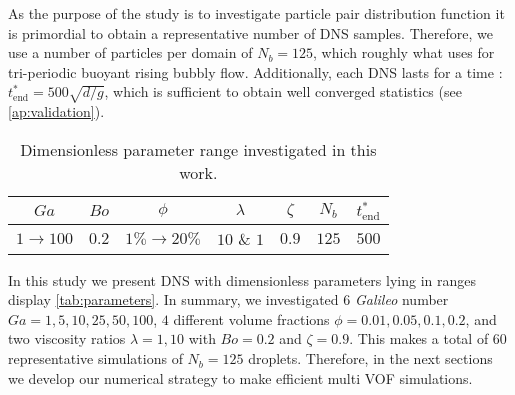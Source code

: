 As the purpose of the study is to investigate particle pair distribution function it is primordial to obtain a representative number of DNS samples. 
Therefore, we use a number of particles per domain of $N_b = 125$, which roughly what \citet{hidman2023assessing} uses for tri-periodic buoyant rising bubbly flow. 
Additionally, each DNS lasts for a time : $t^*_\text{end} = 500 \sqrt{d/g}$, which is sufficient to obtain well converged statistics (see \ref{ap:validation}).  
\begin{table}[h!]
    \centering
    \caption{Dimensionless parameter range investigated in this work.}
    \begin{tabular}{ccccccc}\hline
        $Ga$&$Bo$&$\phi$&$\lambda$&$\zeta$&$N_b$&$t^*_\text{end}$\\ \hline\hline
        $1\rightarrow 100$&$0.2$&$1\% \rightarrow 20\%$&$10$ \& $1$&$0.9$&$125$&$500$\\ \hline
    \end{tabular}
    \label{tab:simulations}
\end{table}
In this study we present DNS with dimensionless parameters lying in ranges display \ref{tab:parameters}.
In summary, we investigated $6$ \textit{Galileo} number $Ga = 1,5,10,25,50,100$, $4$ different volume fractions $\phi = 0.01,0.05,0.1,0.2$, and two viscosity ratios $\lambda =1,10$ with $Bo = 0.2$ and $\zeta = 0.9$. 
This makes a total of $60$ representative simulations of $N_b = 125$ droplets. 
Therefore, in the next sections we develop our numerical strategy to make efficient multi VOF simulations. 








